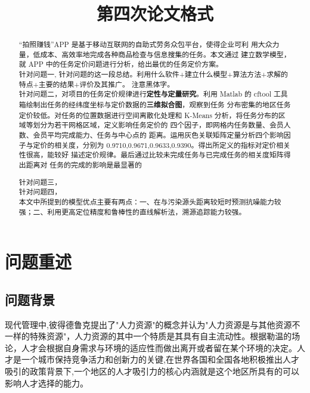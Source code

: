 \documentclass{whutmod}
\title{第四次论文格式}
\begin{document}
	
	\begin{abstract}
“拍照赚钱”APP 是基于移动互联网的自助式劳务众包平台，使得企业可利 用大众力量，低成本、高效率地完成各种商品检查与信息搜集的任务。本文通过 建立数学模型，就 APP 中的任务定价问题进行分析，给出最优的任务定价方案。
   ~\\%
   
针对问题一, 针对问题的这一段总结。利用什么软件+建立什么模型+算法方法+求解的特点+主要的结果+评价及其推广。  注意黑体字。
~\\

针对问题二，对项目的任务定价规律进行\textbf{定性与定量研究}。利用 Matlab 的 cftool 工具箱绘制出任务的经纬度坐标与定价数据的\textbf{三维拟合图}，观察到任务 分布密集的地区任务定价较低。对任务的位置数据进行空间离散化处理和 K-Means 分析，将任务分布的区域等划分为若干网格区域，定义影响任务定价的 四个因子，即网格内任务数量、会员人数、会员平均完成能力、任务与中心点的 距离。运用灰色关联矩阵定量分析四个影响因子与定价的相关度，分别为 0.9710,0.9671,0.9633,0.9390。得出所定义的指标对定价相关性很高，能较好 描述定价规律。最后通过比较未完成任务与已完成任务的相关度矩阵得出距离对 任务的完成的影响是最显著的


针对问题三，
   ~\\
   
针对问题四，
   ~\\

本文中所提到的模型优点主要有两点：一、在与污染源头距离较短时预测抗噪能力较强；二、利用更高定位精度和鲁棒性的直线解析法，溯源追踪能力较强。
  
		
	\end{abstract}
	
	\tableofcontents
	\newpage	%
	
	\section{问题重述}	
	\subsection{问题背景}
现代管理中,彼得德鲁克提出了"人力资源"的概念并认为"人力资源是与其他资源不一样的特殊资源"，人力资源的其中一个特质是其具有自主流动性。根据勒温的场论，人才会根据自身需求与环境的适应性而做出离开或者留在某个环境的决定。人才是一个城市保持竞争活力和创新力的关键,在世界各国和全国各地积极推出人才吸引的政策背景下,一个地区的人才吸引力的核心内涵就是这个地区所具有的可以影响人才选择的能力。
\end{document}
